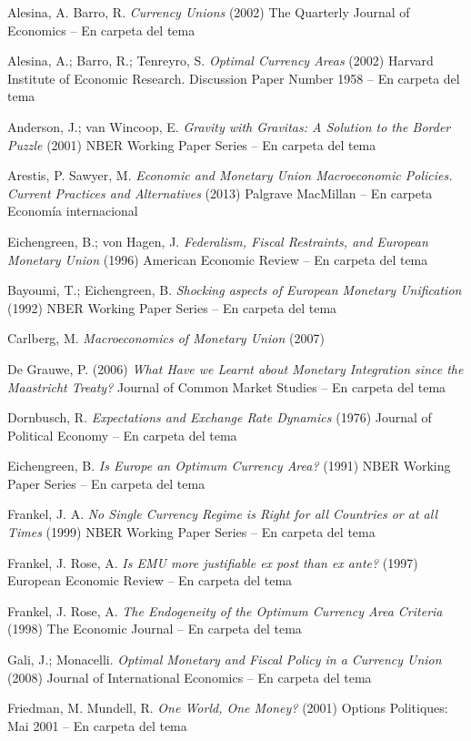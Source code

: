 \documentclass{nuevotema}
\begin{document}
Alesina, A. Barro, R. \textit{Currency Unions} (2002) The  Quarterly Journal of Economics -- En carpeta del tema

Alesina, A.; Barro, R.; Tenreyro, S. \textit{Optimal Currency Areas} (2002) Harvard Institute of Economic Research. Discussion Paper Number 1958 -- En carpeta del tema

Anderson, J.; van Wincoop, E. \textit{Gravity with Gravitas: A Solution to the Border Puzzle} (2001) NBER Working Paper Series -- En carpeta del tema

Arestis, P. Sawyer, M. \textit{Economic and Monetary Union Macroeconomic Policies. Current Practices and Alternatives} (2013) Palgrave MacMillan -- En carpeta Economía internacional

Eichengreen, B.; von Hagen, J. \textit{Federalism, Fiscal Restraints, and European Monetary Union} (1996) American Economic Review -- En carpeta del tema

Bayoumi, T.; Eichengreen, B. \textit{Shocking aspects of European Monetary Unification} (1992) NBER Working Paper Series -- En carpeta del tema

Carlberg, M. \textit{Macroeconomics of Monetary Union} (2007)

De Grauwe, P. (2006) \textit{What Have we Learnt about Monetary Integration since the Maastricht Treaty?} Journal of Common Market Studies -- En carpeta del tema

Dornbusch, R. \textit{Expectations and Exchange Rate Dynamics} (1976) Journal of Political Economy -- En carpeta del tema

Eichengreen, B. \textit{Is Europe an Optimum Currency Area?} (1991) NBER Working Paper Series -- En carpeta del tema

Frankel, J. A. \textit{No Single Currency Regime is Right for all Countries or at all Times} (1999) NBER Working Paper Series -- En carpeta del tema

Frankel, J. Rose, A. \textit{Is EMU more justifiable ex post than ex ante?} (1997) European Economic Review -- En carpeta del tema

Frankel, J. Rose, A. \textit{The Endogeneity of the Optimum Currency Area Criteria} (1998) The Economic Journal -- En carpeta del tema

Gali, J.; Monacelli. \textit{Optimal Monetary and Fiscal Policy in a Currency Union} (2008) Journal of International Economics -- En carpeta del tema

Friedman, M. Mundell, R. \textit{One World, One Money?} (2001) Options Politiques: Mai 2001 -- En carpeta del tema
\end{document}
